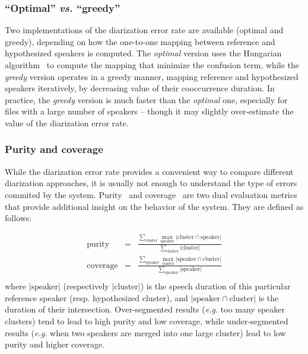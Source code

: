 \documentclass[a4paper]{article}
\begin{document}
\subsubsection{``Optimal'' \emph{vs.} ``greedy''}

Two implementations of the diarization error rate are available (optimal and greedy), depending on how the one-to-one mapping between reference and hypothesized speakers is computed.
The \emph{optimal} version uses the Hungarian algorithm~\cite{Kuhn1955} to compute the mapping that minimize the confusion term, while the \emph{greedy} version operates in a greedy manner, mapping reference and hypothesized speakers iteratively, by decreasing value of their cooccurrence duration.
In practice, the \emph{greedy} version is much faster than the \emph{optimal} one, especially for files with a large number of speakers -- though it may slightly over-estimate the value of the diarization error rate.

\subsubsection{Purity and coverage}

While the diarization error rate provides a convenient way to compare different diarization approaches, it is usually not enough to understand the type of errors commited by the system.
Purity~\cite{cettolo2000segmentation} and coverage~\cite{gauvain1998partitioning} are two dual evaluation metrics that provide additional insight on the behavior of the system.
They are defined as follows:

\begin{eqnarray*}
   \text{purity} & = & \frac{\displaystyle \sum_{\text{cluster}} \max_{\text{speaker}} |\text{cluster} \cap \text{speaker}|  }{\displaystyle \sum_{\text{cluster}} |\text{cluster}|} \\
  \text{coverage} & = & \frac{\displaystyle \sum_{\text{speaker}} \max_{\text{cluster}} |\text{speaker} \cap \text{cluster}|  }{\displaystyle \sum_{\text{speaker}} |\text{speaker}|} \\
\end{eqnarray*}
where $|\text{speaker}|$ (respectively $|\text{cluster}|$) is the speech duration of this particular reference speaker (resp. hypothesized cluster), and  $|\text{speaker} \cap \text{cluster}|$ is the duration of their intersection.
Over-segmented results (\emph{e.g.} too many speaker clusters) tend to lead to high purity and low coverage, while under-segmented results (\emph{e.g.} when two speakers are merged into one large cluster) lead to low purity and higher coverage.
\end{document}
